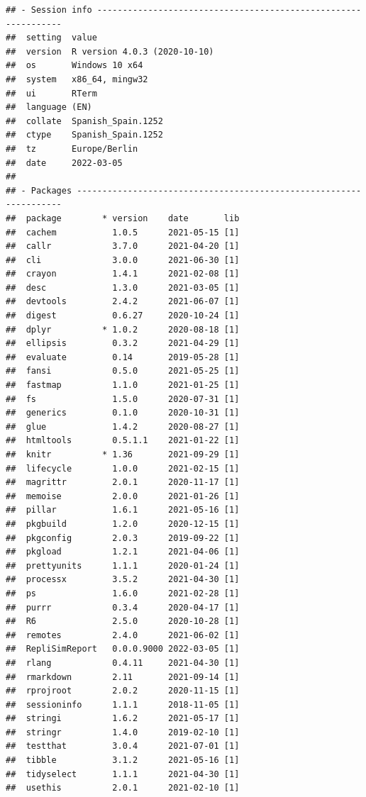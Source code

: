 \documentclass[10,a4paperpaper,]{article}
\begin{document}
\begin{verbatim}
## - Session info ---------------------------------------------------------------
##  setting  value                       
##  version  R version 4.0.3 (2020-10-10)
##  os       Windows 10 x64              
##  system   x86_64, mingw32             
##  ui       RTerm                       
##  language (EN)                        
##  collate  Spanish_Spain.1252          
##  ctype    Spanish_Spain.1252          
##  tz       Europe/Berlin               
##  date     2022-03-05                  
## 
## - Packages -------------------------------------------------------------------
##  package        * version    date       lib
##  cachem           1.0.5      2021-05-15 [1]
##  callr            3.7.0      2021-04-20 [1]
##  cli              3.0.0      2021-06-30 [1]
##  crayon           1.4.1      2021-02-08 [1]
##  desc             1.3.0      2021-03-05 [1]
##  devtools         2.4.2      2021-06-07 [1]
##  digest           0.6.27     2020-10-24 [1]
##  dplyr          * 1.0.2      2020-08-18 [1]
##  ellipsis         0.3.2      2021-04-29 [1]
##  evaluate         0.14       2019-05-28 [1]
##  fansi            0.5.0      2021-05-25 [1]
##  fastmap          1.1.0      2021-01-25 [1]
##  fs               1.5.0      2020-07-31 [1]
##  generics         0.1.0      2020-10-31 [1]
##  glue             1.4.2      2020-08-27 [1]
##  htmltools        0.5.1.1    2021-01-22 [1]
##  knitr          * 1.36       2021-09-29 [1]
##  lifecycle        1.0.0      2021-02-15 [1]
##  magrittr         2.0.1      2020-11-17 [1]
##  memoise          2.0.0      2021-01-26 [1]
##  pillar           1.6.1      2021-05-16 [1]
##  pkgbuild         1.2.0      2020-12-15 [1]
##  pkgconfig        2.0.3      2019-09-22 [1]
##  pkgload          1.2.1      2021-04-06 [1]
##  prettyunits      1.1.1      2020-01-24 [1]
##  processx         3.5.2      2021-04-30 [1]
##  ps               1.6.0      2021-02-28 [1]
##  purrr            0.3.4      2020-04-17 [1]
##  R6               2.5.0      2020-10-28 [1]
##  remotes          2.4.0      2021-06-02 [1]
##  RepliSimReport   0.0.0.9000 2022-03-05 [1]
##  rlang            0.4.11     2021-04-30 [1]
##  rmarkdown        2.11       2021-09-14 [1]
##  rprojroot        2.0.2      2020-11-15 [1]
##  sessioninfo      1.1.1      2018-11-05 [1]
##  stringi          1.6.2      2021-05-17 [1]
##  stringr          1.4.0      2019-02-10 [1]
##  testthat         3.0.4      2021-07-01 [1]
##  tibble           3.1.2      2021-05-16 [1]
##  tidyselect       1.1.1      2021-04-30 [1]
##  usethis          2.0.1      2021-02-10 [1]

\end{verbatim}
\end{document}
